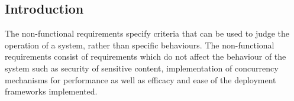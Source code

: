 \subsection{Introduction}
The non-functional requirements specify criteria that can be used to judge the operation of a system, rather than specific behaviours. The non-functional requirements consist of requirements which do not affect the behaviour of the system such as security of sensitive content, implementation of concurrency mechanisms for performance as well as efficacy and ease of the deployment frameworks implemented.
